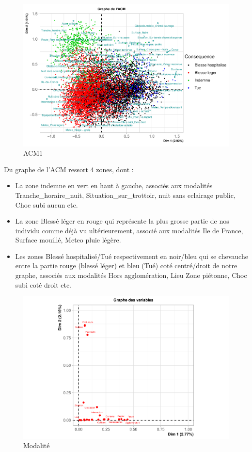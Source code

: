 \documentclass[french,]{compterendu}
\providecommand{\tightlist}{%
  \setlength{\itemsep}{0pt}\setlength{\parskip}{0pt}}
\theoremstyle{urcastyle}
\theoremstyle{remark}
\begin{document}
\begin{figure}[H]

{\centering \includegraphics[width=0.9\linewidth]{Rapport_ADD_LEO-GABET_files/figure-latex/acm1-1} 

}

\caption{ACM1}\label{fig:acm1}
\end{figure}

Du graphe de l'ACM ressort 4 zones, dont :

\begin{itemize}
\tightlist
\item
  La zone indemne en vert en haut à gauche, associés aux modalités Tranche\_horaire\_nuit, Situation\_sur\_trottoir, nuit sans eclairage public, Choc subi aucun etc.
\item
  La zone Blessé léger en rouge qui représente la plus grosse partie de nos individu comme déjà vu ultérieurement, associé aux modalités Ile de France, Surface mouillé, Meteo pluie légère.
\item
  Les zones Blessé hospitalisé/Tué respectivement en noir/bleu qui se chevauche entre la partie rouge (blessé léger) et bleu (Tué) coté centré/droit de notre graphe, associés aux modalités Hors agglomération, Lieu Zone piétonne, Choc subi coté droit etc.
\end{itemize}

\begin{figure}[H]

{\centering \includegraphics[width=0.9\linewidth]{Rapport_ADD_LEO-GABET_files/figure-latex/acm1moda-1} 

}

\caption{Modalité}\label{fig:acm1moda}
\end{figure}
\end{document}
